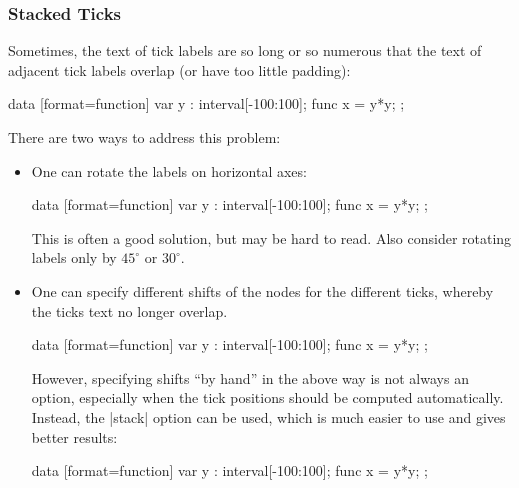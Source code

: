 \subsubsection{Stacked Ticks}
\label{section-dv-stacking}

Sometimes, the text of tick labels are so long or so numerous that the text of adjacent tick labels overlap (or have too little padding):
%
\begin{codeexample}[preamble={\usetikzlibrary{datavisualization.formats.functions}}]
\tikz \datavisualization [scientific axes,
                          all axes={length=2.5cm},
                          visualize as smooth line]
  data [format=function] {
    var y : interval[-100:100];
    func x = \value y*\value y;
  };
\end{codeexample}
%
There are two ways to address this problem:
%
\begin{itemize}
    \item One can rotate the labels on horizontal axes:
\begin{codeexample}[preamble={\usetikzlibrary{datavisualization.formats.functions}}]
\tikz \datavisualization [scientific axes,
                          all axes={length=2.5cm},
                          x axis={ticks={node style={rotate=90, anchor=east}}},
                          visualize as smooth line]
  data [format=function] {
    var y : interval[-100:100];
    func x = \value y*\value y;
  };
\end{codeexample}
        This is often a good solution, but may be hard to read. Also consider rotating labels only by $45^\circ$ or $30^\circ$.
    \item One can specify different shifts of the nodes for the different ticks, whereby the ticks text no longer overlap.
\begin{codeexample}[preamble={\usetikzlibrary{datavisualization.formats.functions}}]
\tikz \datavisualization [scientific axes,
                          all axes={length=2.5cm},
                          x axis={ticks={major at={0,4000,8000,
                                2000 as [node style={yshift=-1em}],
                                6000 as [node style={yshift=-1em}],
                                10000 as [node style={yshift=-1em}]}}},
                          visualize as smooth line]
  data [format=function] {
    var y : interval[-100:100];
    func x = \value y*\value y;
  };
\end{codeexample}
        However, specifying shifts ``by hand'' in the above way is not always an option, especially when the tick positions should be computed automatically. Instead, the |stack| option can be used, which is much easier to use and gives better results:
\begin{codeexample}[preamble={\usetikzlibrary{datavisualization.formats.functions}}]
\tikz \datavisualization [scientific axes,
                          all axes={length=2.5cm}, x axis={ticks=stack},
                          visualize as smooth line]
  data [format=function] {
    var y : interval[-100:100];
    func x = \value y*\value y;
  };
\end{codeexample}
\end{itemize}

